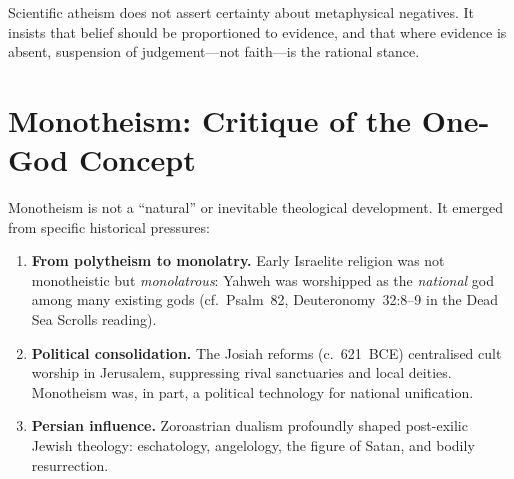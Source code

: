 \documentclass[11pt,twoside]{article}
\begin{document}
\begin{notabox}
Scientific atheism does not assert certainty about metaphysical negatives.
It insists that belief should be proportioned to evidence, and that where
evidence is absent, suspension of judgement---not faith---is the rational
stance.
\end{notabox}

\newpage

\section{Monotheism: Critique of the One-God Concept}

\begin{scheda}

Monotheism is not a ``natural'' or inevitable theological development.  It
emerged from specific historical pressures:

\begin{enumerate}
  \item \textbf{From polytheism to monolatry.}
    Early Israelite religion was not monotheistic but
    \emph{monolatrous}: Yahweh was
    worshipped as the \emph{national} god among many existing gods
    (cf.\ Psalm~82, Deuteronomy~32:8--9 in the Dead Sea Scrolls reading).
  \item \textbf{Political consolidation.}
    The Josiah reforms (c.~621~BCE) centralised cult
    worship in Jerusalem, suppressing rival sanctuaries and local deities.
    Monotheism was, in part, a political technology for national unification.
  \item \textbf{Persian influence.}
    Zoroastrian dualism profoundly shaped post-exilic
    Jewish theology: eschatology, angelology, the figure
    of Satan, and bodily resurrection.
\end{enumerate}
\end{scheda}
\end{document}

